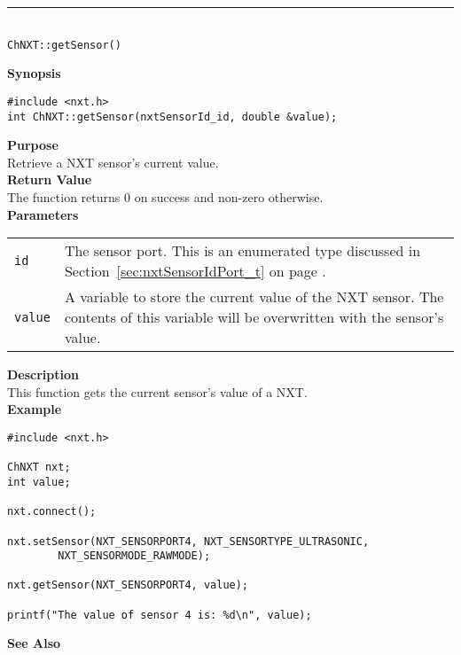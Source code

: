 \noindent
\vspace{5pt}
\rule{4.5in}{0.015in}\\
\noindent
{\LARGE \texttt{ChNXT::getSensor()}}\\
{}

\noindent
{\bf Synopsis}
\vspace{-8pt}
\begin{verbatim}
#include <nxt.h>
int ChNXT::getSensor(nxtSensorId_id, double &value);
\end{verbatim}

\noindent
{\bf Purpose}\\
Retrieve a NXT sensor's current value.\\

\noindent
{\bf Return Value}\\
The function returns 0 on success and non-zero otherwise.\\

\noindent
{\bf Parameters}\\
\vspace{-0.1in}
\begin{description}
\item               
\begin{tabular}{p{15 mm}p{145 mm}}
\texttt{id} & The sensor port. This is an enumerated type 
discussed in Section~\ref{sec:nxtSensorIdPort_t} on page
\pageref{sec:nxtSensorIdPort_t}.\\
\texttt{value} & A variable to store the current value of the NXT 
sensor. The contents of this variable will be overwritten with the 
sensor's value.  \\
\end{tabular}
\end{description}

\noindent
{\bf Description}\\
This function gets the current sensor's value of a NXT.\\

\noindent
{\bf Example}\\
\begin{verbatim}
#include <nxt.h>

ChNXT nxt;
int value;

nxt.connect();

nxt.setSensor(NXT_SENSORPORT4, NXT_SENSORTYPE_ULTRASONIC,
		NXT_SENSORMODE_RAWMODE);

nxt.getSensor(NXT_SENSORPORT4, value);

printf("The value of sensor 4 is: %d\n", value);
\end{verbatim}

\noindent
{\bf See Also}\\

